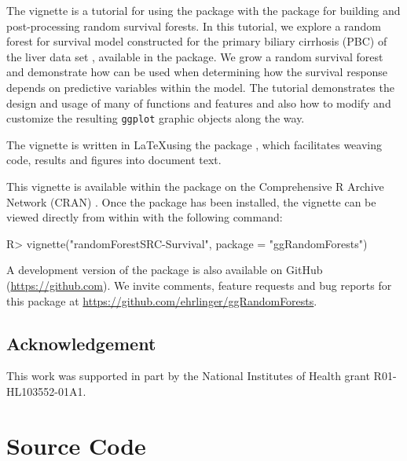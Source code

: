 \documentclass[article, nojss]{jss}
\begin{document}
The vignette is a tutorial for using the  package
with the  package for building and post-processing
random survival forests. In this tutorial, we explore a random forest
for survival model constructed for the primary biliary cirrhosis (PBC)
of the liver data set \citep{fleming:1991}, available in the
 package. We grow a random survival forest and
demonstrate how  can be used when determining how
the survival response depends on predictive variables within the model.
The tutorial demonstrates the design and usage of many of
 functions and features and also how to modify and
customize the resulting \texttt{ggplot} graphic objects along the way.

The vignette is written in \LaTeX using the  package
\citep[\url{http://CRAN.R-project.org/package=knitr}]{Xie:2015, Xie:2014,Xie:2013},
which facilitates weaving  \citep{rcore} code, results and
figures into document text.

This vignette is available within the  package on
the Comprehensive R Archive Network (CRAN)
\citep[\url{http://cran.r-project.org}]{rcore}. Once the package has
been installed, the vignette can be viewed directly from within
 with the following command:

\begin{Schunk}
\begin{Sinput}
R> vignette("randomForestSRC-Survival", package = "ggRandomForests")
\end{Sinput}
\end{Schunk}

A development version of the  package is also
available on GitHub (\url{https://github.com}). We invite comments,
feature requests and bug reports for this package at
\url{https://github.com/ehrlinger/ggRandomForests}.

\subsection{Acknowledgement}\label{acknowledgement}

This work was supported in part by the National Institutes of Health
grant R01-HL103552-01A1.

\appendix

\section{Source Code}\label{source-code}
\end{document}
